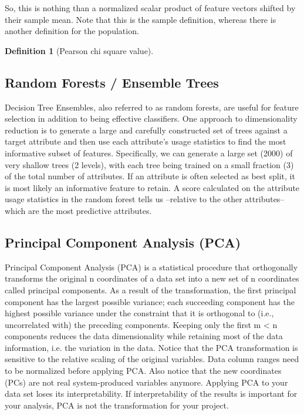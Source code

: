 \documentclass[10pt,a4paper]{article}
\newtheorem{definition}{Definition}
\begin{document}
So, this is nothing than a normalized scalar product of feature vectors shifted by their sample mean. Note that this is the sample definition, whereas there is another definition for the population.

\begin{definition}[Pearson chi square value]
\end{definition}

\subsection*{Random Forests / Ensemble Trees}
Decision Tree Ensembles, also referred to as random forests, are useful for
feature selection in addition to being effective classifiers.  One approach to dimensionality reduction is to generate a large and carefully constructed set of trees against a target attribute and then use each attribute’s usage statistics to find the most informative subset of features.  Specifically, we can generate a large set (2000) of very shallow trees (2 levels), with each tree being trained on a small fraction (3) of the total number of attributes. If an attribute is often selected as best split, it is most likely an informative feature to retain. A score calculated on the attribute usage statistics in the random forest tells us --relative to the other attributes-- which are the most predictive attributes.

\subsection*{Principal Component Analysis (PCA)}
Principal Component Analysis (PCA) is a statistical procedure that orthogonally transforms the original n coordinates of a data set into a new set of n coordinates called principal components. As a result of the transformation, the first principal component has the largest possible variance; each succeeding component has the highest possible variance under the constraint that it is orthogonal to (i.e., uncorrelated with) the preceding components. Keeping only the first m < n components reduces the data dimensionality while retaining most of the data information, i.e. the variation in the data. Notice that the PCA transformation is sensitive to the relative scaling of the original variables. Data column ranges need to be normalized before applying PCA. Also notice that the new coordinates (PCs) are not real system-produced variables anymore. Applying PCA to your data set loses its interpretability. If interpretability of the results is important for your analysis, PCA is not the transformation for your project.
\end{document}
